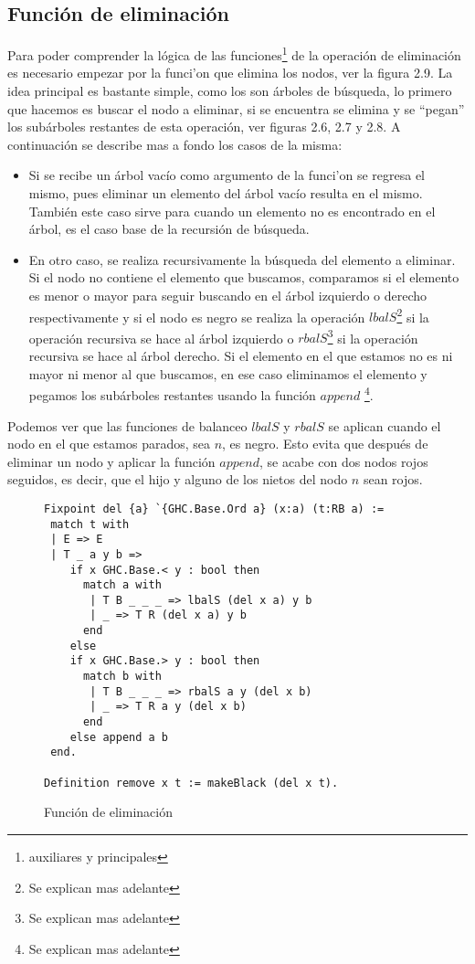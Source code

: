 \subsection{Funci\'on de eliminaci\'on}

Para poder comprender la l\'ogica de las funciones\footnote{auxiliares y principales} de la
operaci\'on de eliminaci\'on es necesario empezar por la funci'on que elimina los nodos, ver la
figura 2.9. La idea principal es bastante simple, como los \arns son \'arboles de búsqueda, lo
primero que hacemos es buscar el nodo a eliminar, si se encuentra se elimina y se ``pegan'' los
subárboles restantes de esta operaci\'on, ver figuras 2.6, 2.7 y 2.8. A continuaci\'on se describe
mas a fondo los casos de la misma:

\begin{itemize}
    \item Si se recibe un \'arbol vacío como argumento de la funci'on se regresa el mismo, pues
    eliminar un elemento del \'arbol vacío resulta en el mismo. También este caso sirve para
    cuando un elemento no es encontrado en el \'arbol, es el caso base de la recursi\'on de
    búsqueda.
    \item En otro caso, se realiza recursivamente la búsqueda del elemento a eliminar. Si el nodo
    no contiene el elemento que buscamos, comparamos si el elemento es menor o mayor para seguir
    buscando en el \'arbol izquierdo o derecho respectivamente y si el nodo es negro se realiza la
    operaci\'on $lbalS$\footnote{Se explican mas adelante} si la operación recursiva se hace al
    árbol izquierdo o $rbalS$\footnote{Se explican mas adelante} si la operación recursiva se hace
    al árbol derecho. Si el elemento en el que estamos no es ni mayor ni menor al que buscamos, en
    ese caso eliminamos el elemento y pegamos los subárboles restantes usando la función $append$
    \footnote{Se explican mas adelante}.
\end{itemize}

Podemos ver que las funciones de balanceo $lbalS$ y $rbalS$ se aplican cuando el nodo en el que
estamos parados, sea $n$, es negro. Esto evita que después de eliminar un nodo y aplicar la
funci\'on $append$, se acabe con dos nodos rojos seguidos, es decir, que el hijo y alguno de los
nietos del nodo $n$ sean rojos.

\begin{figure}
\centering
\captionsetup{justification=centering}
\begin{verbatim}
Fixpoint del {a} `{GHC.Base.Ord a} (x:a) (t:RB a) :=
 match t with
 | E => E
 | T _ a y b =>
    if x GHC.Base.< y : bool then
      match a with
       | T B _ _ _ => lbalS (del x a) y b
       | _ => T R (del x a) y b
      end
    else
    if x GHC.Base.> y : bool then
      match b with
       | T B _ _ _ => rbalS a y (del x b)
       | _ => T R a y (del x b)
      end
    else append a b
 end.

Definition remove x t := makeBlack (del x t).
\end{verbatim}
\caption{Función de eliminación}
\end{figure}

